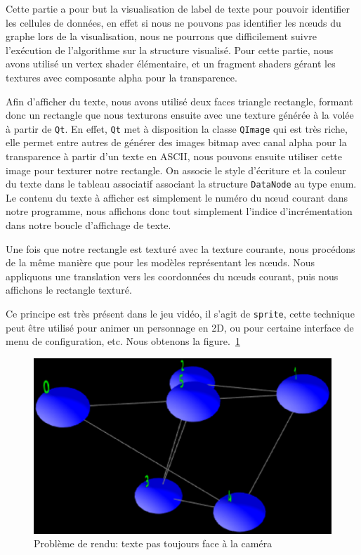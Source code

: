 \documentclass[a4paper, 11pt]{article}
\begin{document}
Cette partie a pour but la visualisation de label de texte pour pouvoir identifier les cellules de données, en effet si nous ne pouvons pas identifier les nœuds du graphe lors de la visualisation, nous ne pourrons que difficilement suivre l'exécution de l'algorithme sur la structure visualisé. Pour cette partie, nous avons utilisé un vertex shader élémentaire, et un fragment shaders gérant les textures avec composante alpha pour la transparence.

Afin d'afficher du texte, nous avons utilisé deux faces triangle rectangle, formant donc un rectangle que nous texturons ensuite avec une texture générée à la volée à partir de \texttt{Qt}. En effet, \texttt{Qt} met à disposition la classe \texttt{QImage} qui est très riche, elle permet entre autres de générer des images bitmap avec canal alpha pour la transparence à partir d'un texte en ASCII, nous pouvons ensuite utiliser cette image pour texturer notre rectangle. On associe le style d'écriture et la couleur du texte dans le tableau associatif associant la structure \texttt{DataNode} au type enum. Le contenu du texte à afficher est simplement le numéro du nœud courant dans notre programme, nous affichons donc tout simplement l'indice d'incrémentation dans notre boucle d'affichage de texte.

Une fois que notre rectangle est texturé avec la texture courante, nous procédons de la même manière que pour les modèles représentant les nœuds. Nous appliquons une translation vers les coordonnées du nœuds courant, puis nous affichons le rectangle texturé.

Ce principe est très présent dans le jeu vidéo, il s'agit de \texttt{sprite}, cette technique peut être utilisé pour animer un personnage en 2D, ou pour certaine interface de menu de configuration, etc. Nous obtenons la figure.~\ref{fig:tnode}

\begin{figure}[h]
  \begin{center}
    \includegraphics[scale=0.4]{contents/tnode}
  \end{center}
  \caption{Problème de rendu: texte pas toujours face à la caméra}
  \label{fig:tnode}
\end{figure}
\end{document}
